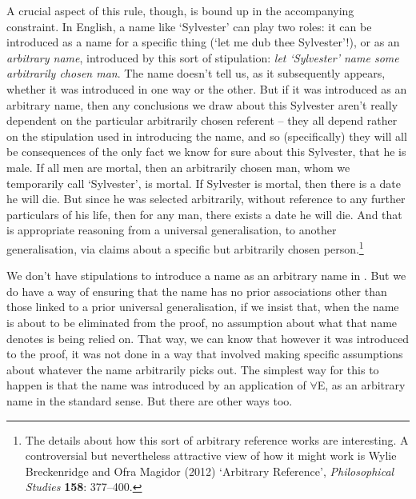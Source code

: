 A crucial aspect of this rule, though, is bound up in the accompanying constraint. In English, a name like `Sylvester' can play two roles: it can be introduced as a name for a specific thing (`let me dub thee Sylvester'!), or as an \emph{arbitrary name}, introduced by this sort of stipulation: \emph{let `Sylvester' name some arbitrarily chosen man}. The name doesn't tell us, as it subsequently appears, whether it was introduced in one way or the other. But if it was introduced as an arbitrary name, then any conclusions we draw about this Sylvester aren't really dependent on the particular arbitrarily chosen referent – they all depend rather on the stipulation used in introducing the name, and so (specifically) they will all be consequences of the only fact we know for sure about this Sylvester, that he is male. If all men are mortal, then an arbitrarily chosen man, whom we temporarily call `Sylvester', is mortal. If Sylvester is mortal, then there is a date he will die. But since he was selected arbitrarily, without reference to any further particulars of his life, then for any man, there exists a date he will die. And that is appropriate reasoning from a universal generalisation, to another generalisation, via claims about a specific but arbitrarily chosen person.\footnote{The details about how this sort of arbitrary reference works are interesting. A controversial but nevertheless attractive view of how it might work is  Wylie Breckenridge and Ofra Magidor (2012) `Arbitrary Reference', \emph{Philosophical Studies} \textbf{158}: 377–400.}

We don't have stipulations to introduce a name as an arbitrary name in \FOL. But we do have a way of ensuring that the name has no prior associations other than those linked to a prior universal generalisation, if we insist that,  when the name is about to be eliminated from the proof, no assumption about what that name denotes is being relied on. That way, we can know that however it was introduced to the proof, it was not done in a way that involved making specific assumptions about whatever the name arbitrarily picks out. The simplest way for this to happen is that the name was introduced by an application of $\forall$E, as an arbitrary name in the standard sense. But there are other ways too.  

